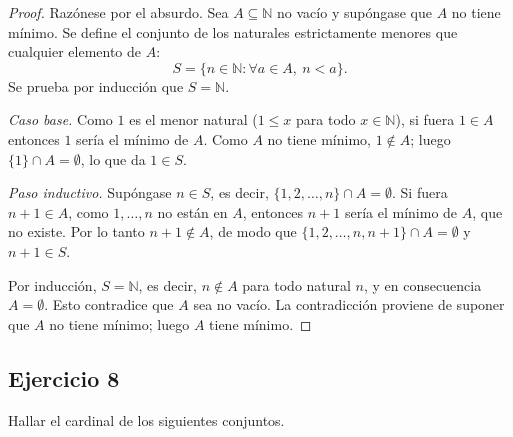 \documentclass[11pt, a4paper]{article}
\begin{document}
\begin{proof}
Razónese por el absurdo. Sea $A \subseteq \mathbb{N}$ no vacío y supóngase que $A$ no tiene mínimo.
Se define el conjunto de los naturales estrictamente menores que cualquier elemento de $A$:
$$ S = \{ n \in \mathbb{N} : \forall a \in A,\ n < a \}. $$
Se prueba por inducción que $S = \mathbb{N}$.

\textit{Caso base.} Como $1$ es el menor natural ($1 \le x$ para todo $x \in \mathbb{N}$), si fuera
$1 \in A$ entonces $1$ sería el mínimo de $A$. Como $A$ no tiene mínimo, $1 \notin A$; luego
$\{1\} \cap A = \emptyset$, lo que da $1 \in S$.

\textit{Paso inductivo.} Supóngase $n \in S$, es decir, $\{1, 2, \dots, n\} \cap A = \emptyset$. Si
fuera $n+1 \in A$, como $1, \dots, n$ no están en $A$, entonces $n+1$ sería el mínimo de $A$, que no
existe. Por lo tanto $n+1 \notin A$, de modo que $\{1, 2, \dots, n, n+1\} \cap A = \emptyset$ y
$n+1 \in S$.

Por inducción, $S = \mathbb{N}$, es decir, $n \notin A$ para todo natural $n$, y en consecuencia
$A = \emptyset$. Esto contradice que $A$ sea no vacío. La contradicción proviene de suponer que $A$
no tiene mínimo; luego $A$ tiene mínimo.
\end{proof}

\subsection*{Ejercicio 8}

Hallar el cardinal de los siguientes conjuntos.
\end{document}
